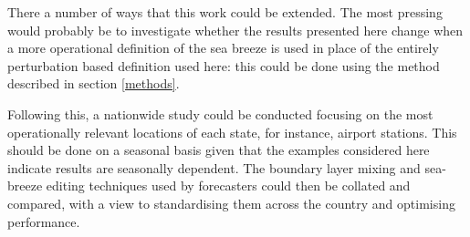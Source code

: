 \documentclass[alpha-refs]{wiley-article}
\begin{document}
There a number of ways that this work could be extended. The most pressing would probably be to investigate whether the results presented here change when a more operational definition of the sea breeze is used in place of the entirely perturbation based definition used here: this could be done using the method described in section \ref{methods}.

Following this, a nationwide study could be conducted focusing on the most operationally relevant locations of each state, for instance, airport stations. This should be done on a seasonal basis given that the examples considered here indicate results are seasonally dependent. The boundary layer mixing and sea-breeze editing techniques used by forecasters could then be collated and compared, with a view to standardising them across the country and optimising performance.


\end{document}
